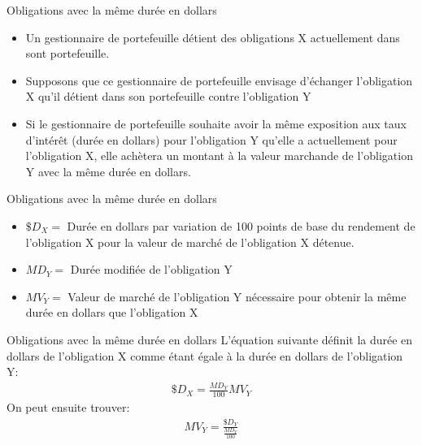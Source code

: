 \documentclass[10pt,a4paper]{beamer}
\begin{document}
\begin{frame}{Obligations avec la même durée en dollars}
\begin{itemize}[label=\bullet]
\item Un gestionnaire de portefeuille détient des obligations X actuellement dans sont portefeuille.

\item Supposons que ce gestionnaire de portefeuille envisage d'échanger l'obligation X qu'il détient dans son portefeuille contre l'obligation Y
\item Si le gestionnaire de portefeuille souhaite avoir la même exposition aux taux d'intérêt (durée en dollars) pour l'obligation Y qu'elle a actuellement pour l'obligation X, elle achètera un montant à la valeur marchande de l'obligation Y avec la même durée en dollars.
\end{itemize}

\end{frame}

\begin{frame}{Obligations avec la même durée en dollars}
\begin{itemize}[label=\bullet]
\item $\$D_X=$ Durée en dollars par variation de 100 points de base du rendement de l'obligation X pour la valeur de marché de l'obligation X détenue.
\item $MD_Y=$ Durée modifiée de l'obligation Y
\item $MV_Y=$ Valeur de marché de l'obligation Y nécessaire pour obtenir la même durée en dollars que l'obligation X
\end{itemize}
\end{frame}

\begin{frame}{Obligations avec la même durée en dollars}
L'équation suivante définit la durée en dollars de l'obligation X comme étant égale à la durée en dollars de l'obligation Y:
\begin{align*}
\$D_X=\frac{MD_Y}{100}MV_Y
\end{align*}
On peut ensuite trouver:
\begin{align*}
MV_Y=\frac{\$ D_Y}{\frac{MD_Y}{100}}
\end{align*}
\end{frame}
\end{document}
